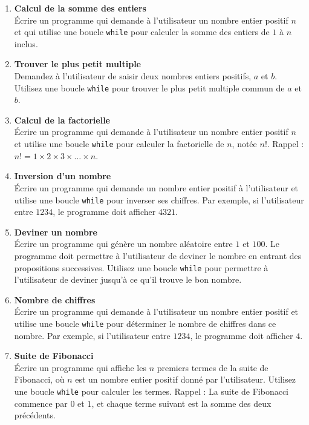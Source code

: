 \begin{enumerate}

    \item \textbf{Calcul de la somme des entiers} \\
    Écrire un programme qui demande à l’utilisateur un nombre entier positif $n$ et qui utilise une boucle \texttt{while} pour calculer la somme des entiers de $1$ à $n$ inclus.
    
    \item \textbf{Trouver le plus petit multiple} \\
    Demandez à l’utilisateur de saisir deux nombres entiers positifs, $a$ et $b$. Utilisez une boucle \texttt{while} pour trouver le plus petit multiple commun de $a$ et $b$.
    
    \item \textbf{Calcul de la factorielle} \\
    Écrire un programme qui demande à l’utilisateur un nombre entier positif $n$ et utilise une boucle \texttt{while} pour calculer la factorielle de $n$, notée $n!$. Rappel : $n! = 1 \times 2 \times 3 \times \dots \times n$.
    
    \item \textbf{Inversion d'un nombre} \\
    Écrire un programme qui demande un nombre entier positif à l'utilisateur et utilise une boucle \texttt{while} pour inverser ses chiffres. Par exemple, si l'utilisateur entre $1234$, le programme doit afficher $4321$.
    
    \item \textbf{Deviner un nombre} \\
    Écrire un programme qui génère un nombre aléatoire entre $1$ et $100$. Le programme doit permettre à l’utilisateur de deviner le nombre en entrant des propositions successives. Utilisez une boucle \texttt{while} pour permettre à l’utilisateur de deviner jusqu'à ce qu'il trouve le bon nombre.
    
    \item \textbf{Nombre de chiffres} \\
    Écrire un programme qui demande à l’utilisateur un nombre entier positif et utilise une boucle \texttt{while} pour déterminer le nombre de chiffres dans ce nombre. Par exemple, si l'utilisateur entre $1234$, le programme doit afficher $4$.
    
    \item \textbf{Suite de Fibonacci} \\
    Écrire un programme qui affiche les $n$ premiers termes de la suite de Fibonacci, où $n$ est un nombre entier positif donné par l’utilisateur. Utilisez une boucle \texttt{while} pour calculer les termes. Rappel : La suite de Fibonacci commence par $0$ et $1$, et chaque terme suivant est la somme des deux précédents.
    

\end{enumerate}
